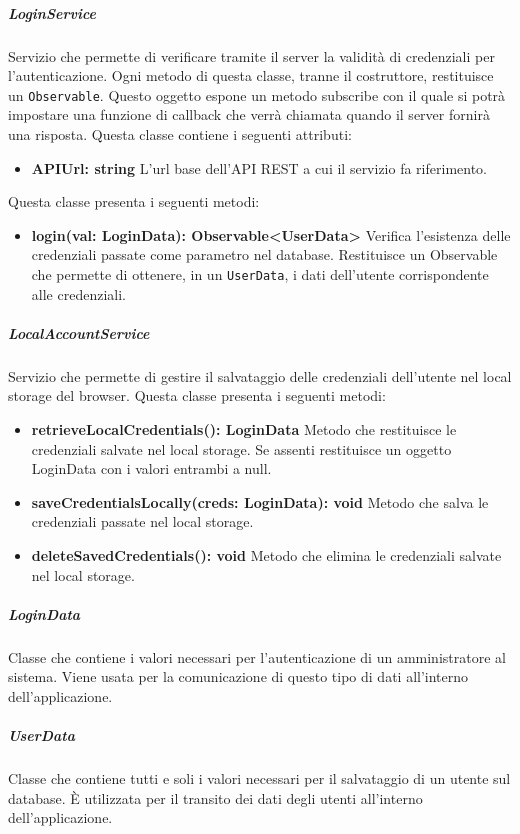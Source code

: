 \subparagraph{LoginService}
Servizio che permette di verificare tramite il server la validità di credenziali per l'autenticazione. Ogni metodo di questa classe, tranne il costruttore, restituisce un \texttt{Observable}. Questo oggetto espone un metodo subscribe con il quale si potrà impostare una funzione di callback che verrà chiamata quando il server fornirà una risposta. \newline
Questa classe contiene i seguenti attributi:
\begin{itemize}
	\item \textbf{APIUrl: string}
	L'url base dell'API REST a cui il servizio fa riferimento.
\end{itemize}
Questa classe presenta i seguenti metodi:
\begin{itemize}
	\item \textbf{login(val: LoginData): Observable<UserData>} \newline
	Verifica l'esistenza delle credenziali passate come parametro nel database. Restituisce un Observable che permette di ottenere, in un \texttt{UserData}, i dati dell'utente corrispondente alle credenziali.
\end{itemize}
\subparagraph{LocalAccountService}
Servizio che permette di gestire il salvataggio delle credenziali dell'utente nel local storage del browser. \newline
Questa classe presenta i seguenti metodi:
\begin{itemize}
	\item \textbf{retrieveLocalCredentials(): LoginData} \newline
	Metodo che restituisce le credenziali salvate nel local storage. Se assenti restituisce un oggetto LoginData con i valori entrambi a null.
	\item \textbf{saveCredentialsLocally(creds: LoginData): void} \newline
	Metodo che salva le credenziali passate nel local storage.
	\item \textbf{deleteSavedCredentials(): void} \newline
	Metodo che elimina le credenziali salvate nel local storage.
	
\end{itemize}
\subparagraph{LoginData}
Classe che contiene i valori necessari per l'autenticazione di un amministratore al sistema. Viene usata per la comunicazione di questo tipo di dati all'interno dell'applicazione. \newline
\subparagraph{UserData}
Classe che contiene tutti e soli i valori necessari per il salvataggio di un utente sul database. È utilizzata per il transito dei dati degli utenti all'interno dell'applicazione. \newline

